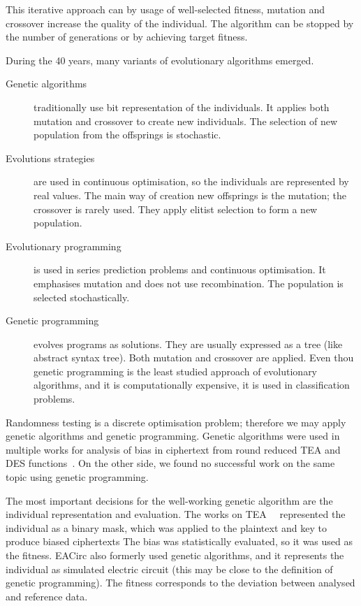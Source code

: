 \documentclass[
  print, %
  Table,   %
  nolof,     %
  nolot,     %
  11pt, %
  oneside  %
]{fithesis3}
\begin{document}
This iterative approach can by usage of well-selected fitness, mutation and crossover increase the quality of the individual. The algorithm can be stopped by the number of generations or by achieving target fitness.

During the 40 years, many variants of evolutionary algorithms emerged.

\begin{description}
    \item[Genetic algorithms] traditionally use bit representation of the individuals. It applies both mutation and crossover to create new individuals. The selection of new population from the offsprings is stochastic.
    \item[Evolutions strategies] are used in continuous optimisation, so the individuals are represented by real values. The main way of creation new offsprings is the mutation; the crossover is rarely used. They apply elitist selection to form a new population.
    \item[Evolutionary programming] is used in series prediction problems and continuous optimisation. It emphasises mutation and does not use recombination. The population is selected stochastically.
    \item[Genetic programming] evolves programs as solutions. They are usually expressed as a tree (like abstract syntax tree). Both mutation and crossover are applied. Even thou genetic programming is the least studied approach of evolutionary algorithms, and it is computationally expensive, it is used in classification problems.
\end{description}

Randomness testing is a discrete optimisation problem; therefore we may apply genetic algorithms and genetic programming. Genetic algorithms were used in multiple works for analysis of bias in ciphertext from round reduced TEA and DES functions~\cite{twoRoundsTea,fourRoundsTea,fiveRoundsTea,song2007cryptanalysis,husein2007genetic}. On the other side, we found no successful work on the same topic using genetic programming.

The most important decisions for the well-working genetic algorithm are the individual representation and evaluation. The works on TEA~~\cite{twoRoundsTea,fourRoundsTea,fiveRoundsTea} represented the individual as a binary mask, which was applied to the plaintext and key to produce biased ciphertexts The bias was statistically evaluated, so it was used as the fitness. EACirc also formerly used genetic algorithms, and it represents the individual as simulated electric circuit (this may be close to the definition of genetic programming). The fitness corresponds to the deviation between analysed and reference data.
\end{document}
